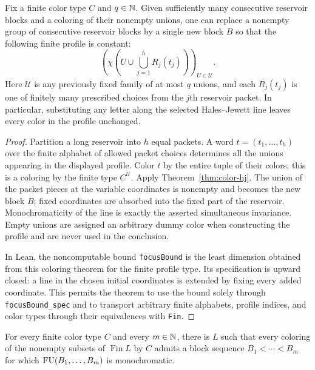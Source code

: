 \begin{lemma}
\label{lem:fu-focus}
Fix a finite color type $C$ and $q\in\mathbb{N}$.  Given sufficiently many consecutive reservoir blocks
and a coloring of their nonempty unions, one can replace a nonempty group of consecutive reservoir
blocks by a single new block $B$ so that the following finite profile is constant:
\[
  \left(
  \chi\left(U\cup\bigcup_{j=1}^{h}R_j(t_j)\right)
  \right)_{U\in\mathcal U}.
\]
Here $\mathcal U$ is any previously fixed family of at most $q$ unions, and each $R_j(t_j)$ is one
of finitely many prescribed choices from the $j$th reservoir packet.  In particular, substituting
any letter along the selected Hales--Jewett line leaves every color in the profile unchanged.
\end{lemma}

\begin{proof}
Partition a long reservoir into $h$ equal packets.  A word
$t=(t_1,\ldots,t_h)$ over the finite alphabet of allowed packet choices determines all the unions
appearing in the displayed profile.  Color $t$ by the entire tuple of their colors; this is a
coloring by the finite type $C^{\mathcal U}$.  Apply Theorem~\ref{thm:color-hj}.  The union of the
packet pieces at the variable coordinates is nonempty and becomes the new block $B$; fixed
coordinates are absorbed into the fixed part of the reservoir.  Monochromaticity of the line is
exactly the asserted simultaneous invariance.  Empty unions are assigned an arbitrary dummy color
when constructing the profile and are never used in the conclusion.

In Lean, the noncomputable bound \texttt{focusBound} is the least dimension obtained from this
coloring theorem for the finite profile type.  Its specification is upward closed: a line in the
chosen initial coordinates is extended by fixing every added coordinate.  This permits the theorem
to use the bound solely through \texttt{focusBound\_spec} and to transport arbitrary finite
alphabets, profile indices, and color types through their equivalences with \texttt{Fin}.
\end{proof}

\begin{theorem}
\label{thm:finite-unions}
For every finite color type $C$ and every $m\in\mathbb{N}$, there is $L$ such that every coloring of the
nonempty subsets of $\operatorname{Fin}L$ by $C$ admits a block sequence
$B_1<\cdots<B_m$ for which $\operatorname{FU}(B_1,\ldots,B_m)$ is monochromatic.
\end{theorem}

